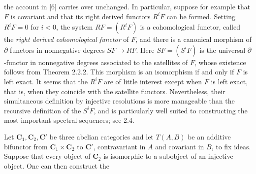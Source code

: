 the account in [6] carries over unchanged.
In particular, suppose for example that $F$ is covariant and that its right
derived functors $R^iF$ can be formed. Setting $R^iF=0$ for $i<0$, the system
$RF=(R^iF)$ is a cohomological functor, called the \textit{right derived
cohomological functor} of $F$, and there is a canonical morphism of
$\partial$-functors in nonnegative degrees
$SF\to RF$. Here $SF=(S^iF)$ is the universal
$\partial$-functor in nonnegative degrees associated to the satellites of
$F$, whose existence follows from Theorem 2.2.2. This morphism is an
isomorphism if and only if $F$ is left exact. It seems that the $R^iF$ are of
little interest except when $F$ is left exact, that is, when they coincide
with the satellite functors. Nevertheless, their simultaneous definition by
injective resolutions is more manageable than the recursive definition of
the $S^iF$, and is particularly well suited to constructing the most important
spectral sequences; see 2.4.

Let $\mathbf{C}_1,\mathbf{C}_2,\mathbf{C}'$ be three abelian categories and let $T(A,B)$ be an additive
bifunctor from $\mathbf{C}_1\times \mathbf{C}_2$ to $\mathbf{C}'$, contravariant in $A$ and covariant in
$B$, to fix ideas. Suppose that every object of $\mathbf{C}_2$ is isomorphic to a
subobject of an injective object. One can then construct the

